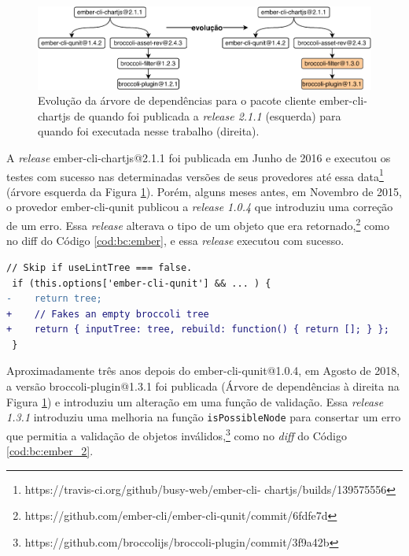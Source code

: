 \begin{figure}
    \centering
    \includegraphics[scale=0.9]{figuras/bc_example_full.pdf}
    \caption{Evolução da árvore de dependências para o pacote cliente \textsf{ember-cli-chartjs} de quando foi publicada a \textit{release 2.1.1} (esquerda) para quando foi executada nesse trabalho (direita).}
    \label{fig:dependency_tree}
\end{figure}

A \textit{release} \textsf{ember-cli-chartjs@2.1.1} foi publicada em Junho de 2016 e executou os testes com sucesso nas determinadas versões de seus provedores até essa data\footnote{https://travis-ci.org/github/busy-web/ember-cli-
chartjs/builds/139575556} (árvore esquerda da Figura \ref{fig:dependency_tree}). Porém, alguns meses antes, em Novembro de 2015, o provedor \textsf{ember-cli-qunit} publicou a \textit{release 1.0.4} que introduziu uma correção de um erro. Essa \textit{release} alterava o tipo de um objeto que era retornado,\footnote{https://github.com/ember-cli/ember-cli-qunit/commit/6fdfe7d} como no diff do Código \ref{cod:bc:ember}, e essa \textit{release} executou com sucesso.

\vspace{0.4cm}
\begin{lstlisting}[numbers=none, language=diff, label=cod:bc:ember, caption={Alteração no tipo do objeto retornado em \textsf{ember-cli-qunit@1.0.4}.}]
 // Skip if useLintTree === false.
 if (this.options['ember-cli-qunit'] && ... ) {
-    return tree;
+    // Fakes an empty broccoli tree
+    return { inputTree: tree, rebuild: function() { return []; } };
 }
\end{lstlisting}

Aproximadamente três anos depois do \textsf{ember-cli-qunit@1.0.4}, em Agosto de 2018, a versão \textsf{broccoli-plugin@1.3.1} foi publicada (Árvore de dependências à direita na Figura \ref{fig:dependency_tree}) e introduziu um alteração em uma função de validação. Essa \textit{release 1.3.1} introduziu uma melhoria na função \texttt{isPossibleNode} para consertar um erro que permitia a validação de objetos inválidos,\footnote{https://github.com/broccolijs/broccoli-plugin/commit/3f9a42b} como no \textit{diff} do Código \ref{cod:bc:ember_2}.

